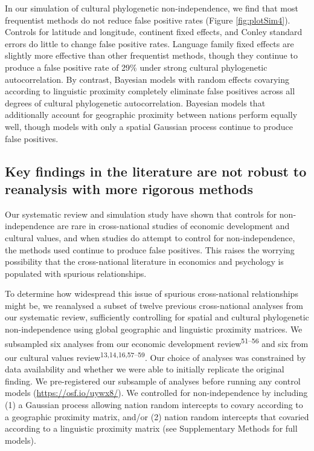 \documentclass[english,man,floatsintext]{apa6}
\begin{document}
In our simulation of cultural phylogenetic non-independence, we find that most frequentist methods do not reduce false positive rates (Figure \ref{fig:plotSim4}). Controls for latitude and longitude, continent fixed effects, and Conley standard errors do little to change false positive rates. Language family fixed effects are slightly more effective than other frequentist methods, though they continue to produce a false positive rate of 29\% under strong cultural phylogenetic autocorrelation. By contrast, Bayesian models with random effects covarying according to linguistic proximity completely eliminate false positives across all degrees of cultural phylogenetic autocorrelation. Bayesian models that additionally account for geographic proximity between nations perform equally well, though models with only a spatial Gaussian process continue to produce false positives.

\hypertarget{key-findings-in-the-literature-are-not-robust-to-reanalysis-with-more-rigorous-methods}{%
\subsection{Key findings in the literature are not robust to reanalysis with more rigorous methods}\label{key-findings-in-the-literature-are-not-robust-to-reanalysis-with-more-rigorous-methods}}

Our systematic review and simulation study have shown that controls for non-independence are rare in cross-national studies of economic development and cultural values, and when studies do attempt to control for non-independence, the methods used continue to produce false positives. This raises the worrying possibility that the cross-national literature in economics and psychology is populated with spurious relationships.

To determine how widespread this issue of spurious cross-national relationships might be, we reanalysed a subset of twelve previous cross-national analyses from our systematic review, sufficiently controlling for spatial and cultural phylogenetic non-independence using global geographic and linguistic proximity matrices. We subsampled six analyses from our economic development review\textsuperscript{51--56} and six from our cultural values review\textsuperscript{13,14,16,57--59}. Our choice of analyses was constrained by data availability and whether we were able to initially replicate the original finding. We pre-registered our subsample of analyses before running any control models (\url{https://osf.io/uywx8/}). We controlled for non-independence by including (1) a Gaussian process allowing nation random intercepts to covary according to a geographic proximity matrix, and/or (2) nation random intercepts that covaried according to a linguistic proximity matrix (see Supplementary Methods for full models).
\end{document}
